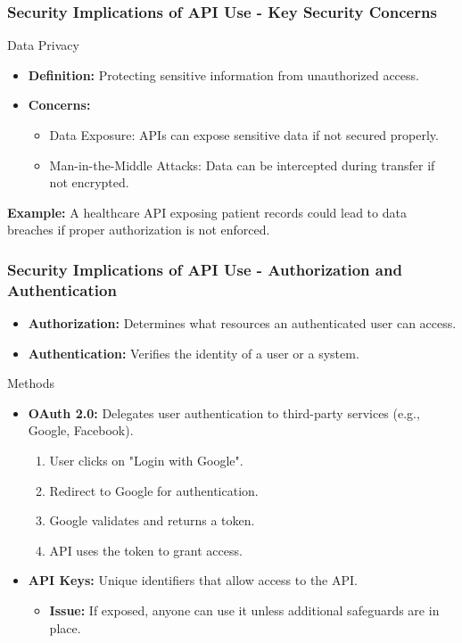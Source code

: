 \documentclass[aspectratio=169]{beamer}
\begin{document}
\begin{frame}[fragile]
    \frametitle{Security Implications of API Use - Key Security Concerns}
    \begin{block}{Data Privacy}
        \begin{itemize}
            \item \textbf{Definition:} Protecting sensitive information from unauthorized access.
            \item \textbf{Concerns:}
            \begin{itemize}
                \item Data Exposure: APIs can expose sensitive data if not secured properly.
                \item Man-in-the-Middle Attacks: Data can be intercepted during transfer if not encrypted.
            \end{itemize}
        \end{itemize}
        \textbf{Example:} A healthcare API exposing patient records could lead to data breaches if proper authorization is not enforced.
    \end{block}
\end{frame}

\begin{frame}[fragile]
    \frametitle{Security Implications of API Use - Authorization and Authentication}
    \begin{itemize}
        \item \textbf{Authorization:} Determines what resources an authenticated user can access.
        \item \textbf{Authentication:} Verifies the identity of a user or a system.
    \end{itemize}
    
    \begin{block}{Methods}
        \begin{itemize}
            \item \textbf{OAuth 2.0:} Delegates user authentication to third-party services (e.g., Google, Facebook).
            \begin{enumerate}
                \item User clicks on "Login with Google".
                \item Redirect to Google for authentication.
                \item Google validates and returns a token.
                \item API uses the token to grant access.
            \end{enumerate}
            \item \textbf{API Keys:} Unique identifiers that allow access to the API.
            \begin{itemize}
                \item \textbf{Issue:} If exposed, anyone can use it unless additional safeguards are in place.
            \end{itemize}
        \end{itemize}
    \end{block}
\end{frame}
\end{document}
